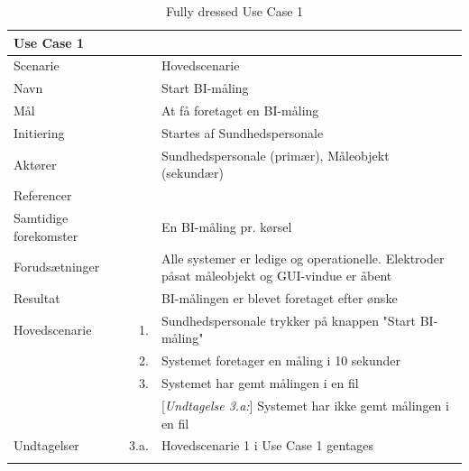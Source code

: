\begin{longtabu} to  %
	{\large \textbf{Use Case 1}} && \\
	\toprule
	Scenarie 				&&	Hovedscenarie\\  
	Navn 					&& 	Start BI-måling\\
	Mål 					&& 	At få foretaget en BI-måling\\
	Initiering 				&& 	Startes af Sundhedspersonale\\
	Aktører 				&& 	Sundhedspersonale (primær), Måleobjekt (sekundær)\\
	Referencer 				&& 	\\
	Samtidige forekomster  	&& 	En BI-måling pr. kørsel \\
	Forudsætninger 			&&	Alle systemer er ledige og operationelle. Elektroder påsat måleobjekt og GUI-vindue er åbent\\ 
	Resultat 				&& 	BI-målingen er blevet foretaget efter ønske\\ \midrule
	Hovedscenarie 			&    1. 	&	Sundhedspersonale trykker på knappen "Start BI-måling"\\				 	
							&    2. 	& 	Systemet foretager en måling i 10 sekunder \\[-1ex]
							& 	 3.		&	 Systemet har gemt målingen i en fil \\[-1ex]
                            &&[\textit{Undtagelse 3.a:}] Systemet har ikke gemt målingen i en fil\\ \midrule
	Undtagelser 			& 3.a. & Hovedscenarie 1 i Use Case 1 gentages\\ \bottomrule
                         
	
	\caption{Fully dressed Use Case 1}
	\label{UC1}
\end{longtabu}

